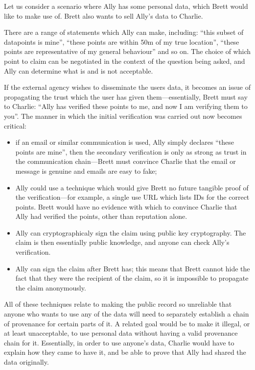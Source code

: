 \documentclass{IOS-Book-Article}     %
\begin{document}
Let us consider a scenario where Ally has some personal data, which Brett would
like to make use of. Brett also wants to sell Ally's data to Charlie.

There are a range of statements which Ally can make, 
including:
``this subset of datapoints is mine'',
``these points are within 50m of my true location'',
``these points are representative of my general behaviour'' and so on. 
The choice of which point to claim can be negotiated
in the context of the question being asked, and Ally can determine what is
and is not acceptable.

If the external agency wishes to disseminate the users data, it becomes an issue
of propagating the trust which the user has given them---essentially, Brett must
say to Charlie: ``Ally has verified these points to me, and now I am
verifying them to you''. The manner in which the initial verification was carried out now becomes
critical:
\begin{itemize}
  \item if an email or similar communication is used, Ally simply declares
  ``these points are mine'', then the secondary verification is only as strong as
  trust in the communication chain---Brett must convince Charlie that the email
  or message is genuine and emails are easy to fake;
  \item Ally could use a technique which would give Brett no future tangible
  proof of the verification---for example, a single use URL which
  lists IDs for the correct points. Brett would have no evidence with which to
  convince Charlie that Ally had verified the points, other than reputation
  alone.
  \item Ally can cryptographicaly sign the claim using public key cryptography.
  The claim is then essentially public knowledge, and anyone can check Ally's verification.
  \item Ally can sign the claim after Brett has; this means that Brett cannot
  hide the fact that they were the recipient of the claim, so it is impossible
  to propagate the claim anonymously.
\end{itemize}

All of these techniques relate to making the public record so unreliable that
anyone who wants to use any of the data will need to separately establish a
chain of provenance for certain parts of it. A related goal would be to make it
illegal, or at least unacceptable, to use personal data without having a valid
provenance chain for it. Essentially, in order to use anyone's data, Charlie
would have to explain how they came to have it, and be able to prove that Ally
had shared the data originally.
\end{document}
